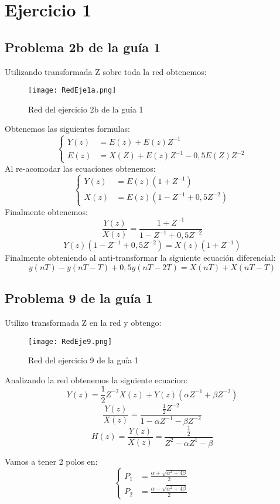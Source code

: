 \chapter*{Ejercicio 1}

\section{Problema 2b de la guía 1}
Utilizando transformada Z sobre toda la red obtenemos:
\begin{figure}[H]
    \centering
    \texttt{[image: RedEje1a.png]}
    \caption{Red del ejercicio 2b de la guía 1}
\end{figure}
Obtenemos las siguientes formulas:
\begin{equation*}
\left\{
\begin{aligned}
Y(z) & = E(z) + E(z)Z^{-1} \\
E(z) & = X(Z) + E(z)Z^{-1} -0,5 E(Z)Z^{-2}
\end{aligned}
\right.
\end{equation*}
Al re-acomodar las ecuaciones obtenemos:
\begin{equation*}
\left\{
\begin{aligned}
Y(z) & = E(z)\left( 1 + Z^{-1} \right)\\
X(z) & = E(z)\left( 1 -Z^{-1}+0,5Z^{-2} \right)
\end{aligned}
\right.
\end{equation*}
Finalmente obtenemos:
$$\frac{Y(z)}{X(z)}=\frac{1+Z^{-1}}{1 -Z^{-1}+0,5Z^{-2}}$$
$$Y(z)\left( 1 -Z^{-1}+0,5Z^{-2} \right)=X(z)\left( 1 + Z^{-1} \right)$$
Finalmente obteniendo al anti-transformar la siguiente ecuación diferencial:
$$y(nT)-y(nT-T)+0,5y(nT-2T)=X(nT)+X(nT-T)$$

\section{Problema 9 de la guía 1}
Utilizo transformada Z en la red y obtengo:
\begin{figure}[H]
    \centering
    \texttt{[image: RedEje9.png]}
    \caption{Red del ejercicio 9 de la guía 1}
\end{figure}
Analizando la red obtenemos la siguiente ecuacion:
$$Y(z)= \frac{1}{2} Z^{-2}X(z)+ Y(z) \left( \alpha Z^{-1} + \beta Z^{-2} \right) $$
$$\frac{Y(z)}{X(z)}= \frac{ \frac{1}{2} Z^{-2} } {1- \alpha Z^{-1} - \beta Z^{-2} } $$
$$H(z)=\frac{Y(z)}{X(z)}= \frac{ \frac{1}{2} } {Z^{2}- \alpha Z^{1} - \beta } $$

Vamos a tener 2 polos en:
\begin{equation*}
\left\{
\begin{aligned}
P_1 & = \frac{\alpha + \sqrt{\alpha^2+ 4\beta}}{2}\\
P_2 & = \frac{\alpha - \sqrt{\alpha^2+ 4\beta}}{2}
\end{aligned}
\right.
\end{equation*}
